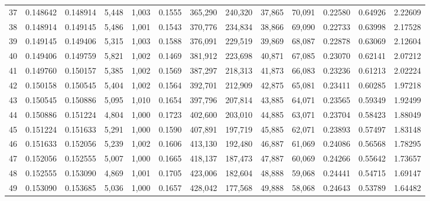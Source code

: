 \begin{tabular}{rrrrrrrrrrrrr}
37  &  0.148642 &  0.148914 &   5,448 &  1,003 &                                     0.1555 &  365,290 &  240,320 &   37,865 &   70,091 &  0.22580 &  0.64926 &  2.22609 \\
38  &  0.148914 &  0.149145 &   5,486 &  1,001 &                                     0.1543 &  370,776 &  234,834 &   38,866 &   69,090 &  0.22733 &  0.63998 &  2.17528 \\
39  &  0.149145 &  0.149406 &   5,315 &  1,003 &                                     0.1588 &  376,091 &  229,519 &   39,869 &   68,087 &  0.22878 &  0.63069 &  2.12604 \\
40  &  0.149406 &  0.149759 &   5,821 &  1,002 &                                     0.1469 &  381,912 &  223,698 &   40,871 &   67,085 &  0.23070 &  0.62141 &  2.07212 \\
41  &  0.149760 &  0.150157 &   5,385 &  1,002 &                                     0.1569 &  387,297 &  218,313 &   41,873 &   66,083 &  0.23236 &  0.61213 &  2.02224 \\
42  &  0.150158 &  0.150545 &   5,404 &  1,002 &                                     0.1564 &  392,701 &  212,909 &   42,875 &   65,081 &  0.23411 &  0.60285 &  1.97218 \\
43  &  0.150545 &  0.150886 &   5,095 &  1,010 &                                     0.1654 &  397,796 &  207,814 &   43,885 &   64,071 &  0.23565 &  0.59349 &  1.92499 \\
44  &  0.150886 &  0.151224 &   4,804 &  1,000 &                                     0.1723 &  402,600 &  203,010 &   44,885 &   63,071 &  0.23704 &  0.58423 &  1.88049 \\
45  &  0.151224 &  0.151633 &   5,291 &  1,000 &                                     0.1590 &  407,891 &  197,719 &   45,885 &   62,071 &  0.23893 &  0.57497 &  1.83148 \\
46  &  0.151633 &  0.152056 &   5,239 &  1,002 &                                     0.1606 &  413,130 &  192,480 &   46,887 &   61,069 &  0.24086 &  0.56568 &  1.78295 \\
47  &  0.152056 &  0.152555 &   5,007 &  1,000 &                                     0.1665 &  418,137 &  187,473 &   47,887 &   60,069 &  0.24266 &  0.55642 &  1.73657 \\
48  &  0.152555 &  0.153090 &   4,869 &  1,001 &                                     0.1705 &  423,006 &  182,604 &   48,888 &   59,068 &  0.24441 &  0.54715 &  1.69147 \\
49  &  0.153090 &  0.153685 &   5,036 &  1,000 &                                     0.1657 &  428,042 &  177,568 &   49,888 &   58,068 &  0.24643 &  0.53789 &  1.64482 \\

\end{tabular}
